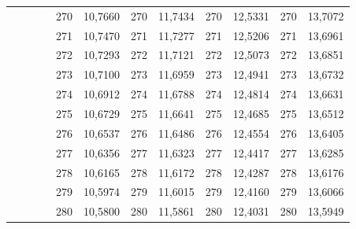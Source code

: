 \documentclass[a4paper,12pt]{article} %
\begin{document}
\begin{longtable}[c]{cccccccccc|c|c|}
	&  &  & \multicolumn{1}{c|}{} & \multicolumn{1}{c|}{270} & \multicolumn{1}{c|}{10,7660} & \multicolumn{1}{c|}{270} & \multicolumn{1}{c|}{11,7434} & \multicolumn{1}{c|}{270} & 12,5331 & 270 & 13,7072 \\ \cline{5-12} 
	&  &  & \multicolumn{1}{c|}{} & \multicolumn{1}{c|}{271} & \multicolumn{1}{c|}{10,7470} & \multicolumn{1}{c|}{271} & \multicolumn{1}{c|}{11,7277} & \multicolumn{1}{c|}{271} & 12,5206 & 271 & 13,6961 \\ \cline{5-12} 
	&  &  & \multicolumn{1}{c|}{} & \multicolumn{1}{c|}{272} & \multicolumn{1}{c|}{10,7293} & \multicolumn{1}{c|}{272} & \multicolumn{1}{c|}{11,7121} & \multicolumn{1}{c|}{272} & 12,5073 & 272 & 13,6851 \\ \cline{5-12} 
	&  &  & \multicolumn{1}{c|}{} & \multicolumn{1}{c|}{273} & \multicolumn{1}{c|}{10,7100} & \multicolumn{1}{c|}{273} & \multicolumn{1}{c|}{11,6959} & \multicolumn{1}{c|}{273} & 12,4941 & 273 & 13,6732 \\ \cline{5-12} 
	&  &  & \multicolumn{1}{c|}{} & \multicolumn{1}{c|}{274} & \multicolumn{1}{c|}{10,6912} & \multicolumn{1}{c|}{274} & \multicolumn{1}{c|}{11,6788} & \multicolumn{1}{c|}{274} & 12,4814 & 274 & 13,6631 \\ \cline{5-12} 
	&  &  & \multicolumn{1}{c|}{} & \multicolumn{1}{c|}{275} & \multicolumn{1}{c|}{10,6729} & \multicolumn{1}{c|}{275} & \multicolumn{1}{c|}{11,6641} & \multicolumn{1}{c|}{275} & 12,4685 & 275 & 13,6512 \\ \cline{5-12} 
	&  &  & \multicolumn{1}{c|}{} & \multicolumn{1}{c|}{276} & \multicolumn{1}{c|}{10,6537} & \multicolumn{1}{c|}{276} & \multicolumn{1}{c|}{11,6486} & \multicolumn{1}{c|}{276} & 12,4554 & 276 & 13,6405 \\ \cline{5-12} 
	&  &  & \multicolumn{1}{c|}{} & \multicolumn{1}{c|}{277} & \multicolumn{1}{c|}{10,6356} & \multicolumn{1}{c|}{277} & \multicolumn{1}{c|}{11,6323} & \multicolumn{1}{c|}{277} & 12,4417 & 277 & 13,6285 \\ \cline{5-12} 
	&  &  & \multicolumn{1}{c|}{} & \multicolumn{1}{c|}{278} & \multicolumn{1}{c|}{10,6165} & \multicolumn{1}{c|}{278} & \multicolumn{1}{c|}{11,6172} & \multicolumn{1}{c|}{278} & 12,4287 & 278 & 13,6176 \\ \cline{5-12} 
	&  &  & \multicolumn{1}{c|}{} & \multicolumn{1}{c|}{279} & \multicolumn{1}{c|}{10,5974} & \multicolumn{1}{c|}{279} & \multicolumn{1}{c|}{11,6015} & \multicolumn{1}{c|}{279} & 12,4160 & 279 & 13,6066 \\ \cline{5-12} 
	&  &  & \multicolumn{1}{c|}{} & \multicolumn{1}{c|}{280} & \multicolumn{1}{c|}{10,5800} & \multicolumn{1}{c|}{280} & \multicolumn{1}{c|}{11,5861} & \multicolumn{1}{c|}{280} & 12,4031 & 280 & 13,5949 \\ \cline{5-12} 

\end{longtable}
\end{document}
